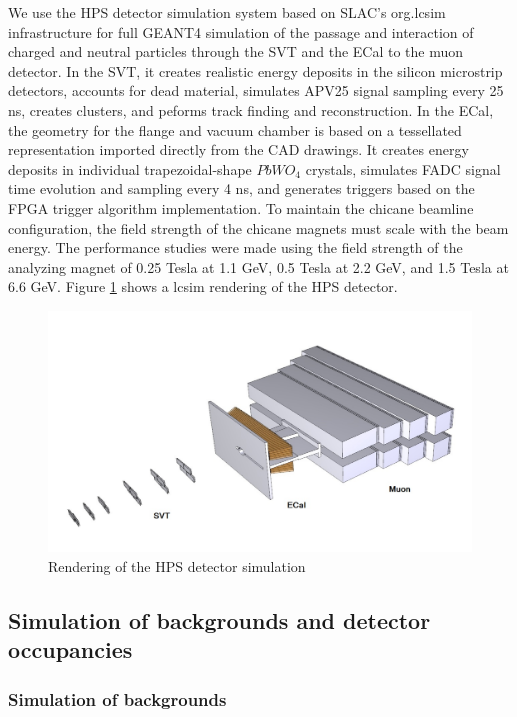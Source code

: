 We use the HPS detector simulation system based on SLAC's org.lcsim infrastructure for full GEANT4
simulation of the passage and interaction of charged and neutral particles through the SVT 
and the ECal to the muon detector. In the SVT, it creates realistic energy deposits in the silicon 
microstrip detectors, accounts for dead material, simulates APV25 signal sampling every 25 ns, 
creates clusters, and peforms track finding and reconstruction.
In the ECal, the geometry for the flange and vacuum chamber is based on a tessellated 
representation imported directly from the CAD drawings. It creates energy deposits in individual 
trapezoidal-shape $PbWO_4$ crystals, simulates FADC signal time evolution and sampling every 4 ns, and 
generates triggers based on the  FPGA trigger algorithm implementation.
To maintain the chicane beamline configuration, the field strength of the
chicane magnets must scale with the beam energy. The performance studies were 
made using the field strength of the 
analyzing magnet of 0.25 Tesla at 1.1 GeV, 0.5 Tesla at 2.2 GeV, and 
1.5 Tesla at 6.6 GeV.
Figure  \ref{fig:lcsim} shows a lcsim rendering of the HPS detector.

\begin{figure}[h]
\includegraphics[width=\textwidth]{performance/lcsimDetector}
\caption{\small{ Rendering of the HPS detector simulation}}
\label{fig:lcsim}
\end{figure}

\subsection{Simulation of backgrounds and detector occupancies}

\subsubsection{Simulation of backgrounds}
\label{sec:backgrounds}

